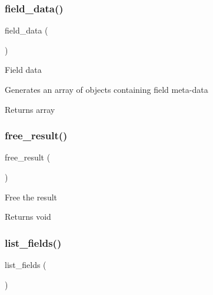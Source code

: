 \subsubsection{\texorpdfstring{field\+\_\+data()}{field\_data()}}
{\footnotesize\ttfamily field\+\_\+data (\begin{DoxyParamCaption}{ }\end{DoxyParamCaption})}

Field data

Generates an array of objects containing field meta-\/data

\begin{DoxyReturn}{Returns}
array 
\end{DoxyReturn}
\mbox{\label{class_c_i___d_b__oci8__result_aad2d98d6beb3d6095405356c6107b473}} 
\subsubsection{\texorpdfstring{free\+\_\+result()}{free\_result()}}
{\footnotesize\ttfamily free\+\_\+result (\begin{DoxyParamCaption}{ }\end{DoxyParamCaption})}

Free the result

\begin{DoxyReturn}{Returns}
void 
\end{DoxyReturn}
\mbox{\label{class_c_i___d_b__oci8__result_a50b54eb4ea7cfd039740f532988ea776}} 
\subsubsection{\texorpdfstring{list\+\_\+fields()}{list\_fields()}}
{\footnotesize\ttfamily list\+\_\+fields (\begin{DoxyParamCaption}{ }\end{DoxyParamCaption})}

